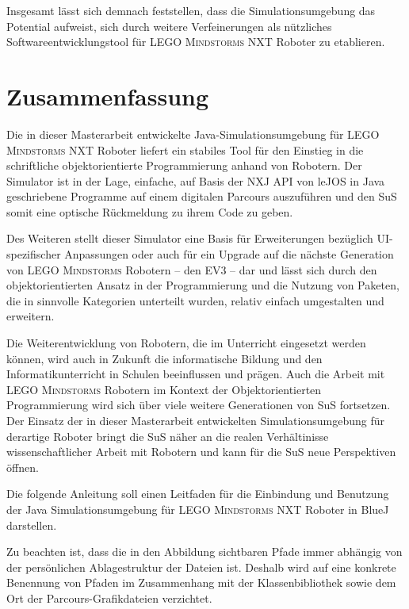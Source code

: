\documentclass[paper=a4, DIV=calc, BCOR=12mm, twoside=on, onecolumn=on, open = right, titlepage =on, parskip =half-, headsepline = on, footsepline = off, chapterprefix = off, appendixprefix = on, fontsize = 12pt, numbers = noenddot, abstract = on]{scrbook}
\begin{document}
Insgesamt lässt sich demnach feststellen, dass die Simulationsumgebung das Potential aufweist, sich durch weitere Verfeinerungen als nützliches Softwareentwicklungstool für \textsc{LEGO Mindstorms} NXT Roboter zu etablieren.

\section{Zusammenfassung}

Die in dieser Masterarbeit entwickelte Java-Simulations\-um\-ge\-bung für \textsc{LEGO Mindstorms} NXT Roboter liefert ein stabiles Tool für den Einstieg in die schriftliche objektorientierte Programmierung anhand von Robotern. Der Simulator ist in der Lage, einfache, auf Basis der NXJ API von leJOS in Java geschriebene Programme auf einem digitalen Parcours auszuführen und den SuS somit eine optische Rückmeldung zu ihrem Code zu geben.

Des Weiteren stellt dieser Simulator eine Basis für Erweiterungen bezüglich UI-spezifischer Anpassungen oder auch für ein Upgrade auf die nächste Generation von \textsc{LEGO Mindstorms} Robotern -- den EV3 -- dar und lässt sich durch den objektorientierten Ansatz in der Programmierung und die Nutzung von Paketen, die in sinnvolle Kategorien unterteilt wurden, relativ einfach umgestalten und erweitern.

Die Weiterentwicklung von Robotern, die im Unterricht eingesetzt werden können, wird auch in Zukunft die informatische Bildung und den Informatikunterricht in Schulen beeinflussen und prägen. Auch die Arbeit mit \textsc{LEGO Mindstorms} Robotern im Kontext der Objektorientierten Programmierung wird sich über viele weitere Generationen von SuS fortsetzen. Der Einsatz der in dieser Masterarbeit entwickelten Simulationsumgebung für derartige Roboter bringt die SuS näher an die realen Verhältinisse wissenschaftlicher Arbeit mit Robotern und kann für die SuS neue Perspektiven öffnen. 

\newpage

\newpage


Die folgende Anleitung soll einen Leitfaden für die Einbindung und Benutzung der Java Simulationsumgebung für \textsc{LEGO Mindstorms} NXT Roboter in BlueJ darstellen.

Zu beachten ist, dass die in den Abbildung sichtbaren Pfade immer abhängig von der persönlichen Ablagestruktur der Dateien ist. Deshalb wird auf eine konkrete Benennung von Pfaden im Zusammenhang mit der Klassenbibliothek sowie dem Ort der Parcours-Grafikdateien verzichtet.
\end{document}
